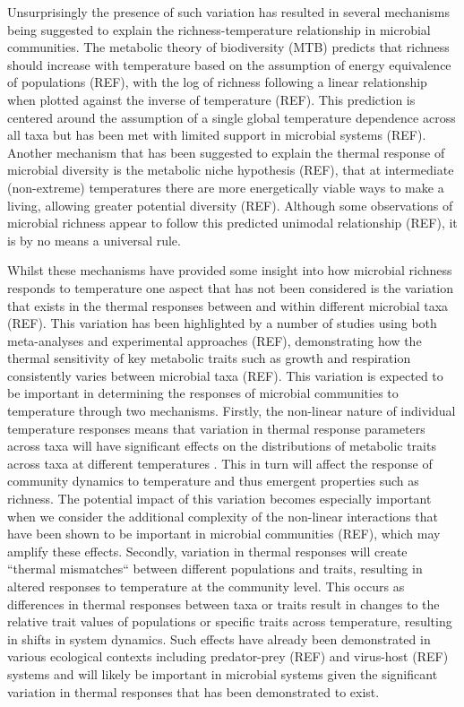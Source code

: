 \documentclass{article}
\begin{document}
Unsurprisingly the presence of such variation has resulted in several mechanisms being suggested to explain the richness-temperature relationship in microbial communities. The metabolic theory of biodiversity (MTB) predicts that richness should increase with temperature based on the assumption of energy equivalence of populations (REF), with the log of richness following a linear relationship when plotted against the inverse of temperature (REF). This prediction is centered around the assumption of a single global temperature dependence across all taxa but has been met with limited support in microbial systems (REF). Another mechanism that has been suggested to explain the thermal response of microbial diversity is the metabolic niche hypothesis (REF), that at intermediate (non-extreme) temperatures there are more energetically viable ways to make a living, allowing greater potential diversity (REF). Although some observations of microbial richness appear to follow this predicted unimodal relationship (REF), it is by no means a universal rule. 

Whilst these mechanisms have provided some insight into how microbial richness responds to temperature one aspect that has not been considered is the variation that exists in the thermal responses between and within different microbial taxa (REF). This variation has been highlighted by a number of studies using both meta-analyses and experimental approaches (REF), demonstrating how the thermal sensitivity of key metabolic traits such as growth and respiration consistently varies between microbial taxa (REF). This variation is expected to be important in determining the responses of microbial communities to temperature through two mechanisms. Firstly, the non-linear nature of individual temperature responses means that variation in thermal response parameters across taxa will have significant effects on the distributions of metabolic traits across taxa at different temperatures \citep{Savage2004}. This in turn will affect the response of community dynamics  to temperature and thus emergent properties such as richness. The potential impact of this variation becomes especially important when we consider the additional complexity of the non-linear interactions that have been shown to be important in microbial communities (REF), which may amplify these effects. Secondly, variation in thermal responses will create ``thermal mismatches`` between different populations and traits, resulting in altered responses to temperature at the community level. This occurs as differences in thermal responses between taxa or traits result in changes to the relative trait values of populations or specific traits across temperature, resulting in shifts in system dynamics. Such effects have already been demonstrated in various ecological contexts including predator-prey (REF) and virus-host (REF) systems and will likely be important in microbial systems given the significant variation in thermal responses that has been demonstrated to exist. 
\end{document}
